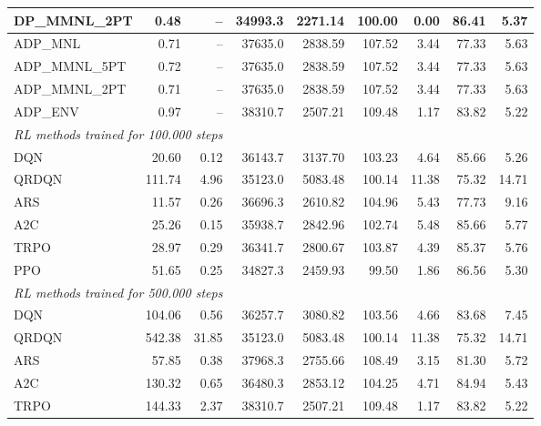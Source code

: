 \begin{samepage}
\begin{center}
\begin{tabular}{l|rr|rr|rr|rr}
    DP\_MMNL\_2PT &     0.48 &    -- &    34993.3 &    2271.14 &  100.00 &    0.00 &   86.41 &    5.37 \\
    \midrule
    ADP\_MNL     &     0.71 &    -- &    37635.0 &    2838.59 &  107.52 &    3.44 &   77.33 &    5.63 \\
    ADP\_MMNL\_5PT &     0.72 &    -- &    37635.0 &    2838.59 &  107.52 &    3.44 &   77.33 &    5.63 \\
    ADP\_MMNL\_2PT &     0.71 &    -- &    37635.0 &    2838.59 &  107.52 &    3.44 &   77.33 &    5.63 \\
    ADP\_ENV     &     0.97 &    -- &    38310.7 &    2507.21 &  109.48 &    1.17 &   83.82 &    5.22 \\
    \midrule
    \multicolumn{9}{l}{\textit{RL methods trained for 100.000 steps}} \\
    \midrule
    DQN          &    20.60 &     0.12 &    36143.7 &    3137.70 &  103.23 &    4.64 &   85.66 &    5.26 \\
    QRDQN        &   111.74 &     4.96 &    35123.0 &    5083.48 &  100.14 &   11.38 &   75.32 &   14.71 \\
    ARS          &    11.57 &     0.26 &    36696.3 &    2610.82 &  104.96 &    5.43 &   77.73 &    9.16 \\
    A2C          &    25.26 &     0.15 &    35938.7 &    2842.96 &  102.74 &    5.48 &   85.66 &    5.77 \\
    TRPO         &    28.97 &     0.29 &    36341.7 &    2800.67 &  103.87 &    4.39 &   85.37 &    5.76 \\
    PPO          &    51.65 &     0.25 &    34827.3 &    2459.93 &   99.50 &    1.86 &   86.56 &    5.30 \\
    \midrule
    \multicolumn{9}{l}{\textit{RL methods trained for 500.000 steps}} \\
    \midrule
    DQN          &   104.06 &     0.56 &    36257.7 &    3080.82 &  103.56 &    4.66 &   83.68 &    7.45 \\
    QRDQN        &   542.38 &    31.85 &    35123.0 &    5083.48 &  100.14 &   11.38 &   75.32 &   14.71 \\
    ARS          &    57.85 &     0.38 &    37968.3 &    2755.66 &  108.49 &    3.15 &   81.30 &    5.72 \\
    A2C          &   130.32 &     0.65 &    36480.3 &    2853.12 &  104.25 &    4.71 &   84.94 &    5.43 \\
    TRPO         &   144.33 &     2.37 &    38310.7 &    2507.21 &  109.48 &    1.17 &   83.82 &    5.22 \\

\end{tabular}
\end{center}
\end{samepage}
